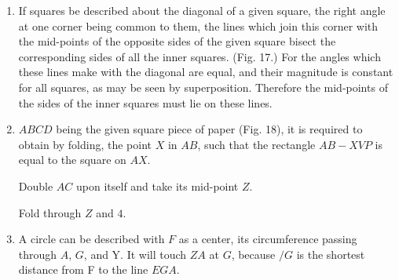 \begin{enumerate}
    \item If squares be described about the diagonal of a given square, the
        right angle at one corner being common to them, the lines which join
        this corner with the mid-points of the opposite sides of the given
        square bisect the corresponding sides of all the inner squares. (Fig.
        17.) For the angles which these lines make with the diagonal are equal,
        and their magnitude is constant for all squares, as may be seen by
        superposition. Therefore the mid-points of the sides of the inner
        squares must lie on these lines.

    \item $ABCD$ being the given square piece of paper (Fig. 18), it is required
        to obtain by folding, the point $X$ in $AB$, such that the rectangle
        $AB-XVP$ is equal to the square on $AX$.

        Double $AC$ upon itself and take its mid-point $Z$.

        Fold through $Z$ and $4$.

%
%
%
%
%
%
%
%
%
    
    \item A circle can be described with $F$ as a center, its circumference
        passing through $A$, $G$, and Y.  It will touch $ZA$ at $G$, because 
        $/G$ is the shortest distance from F to the line $EGA$.

%
%
%
%
%
%
%
%
%
%
%
%
%
%


\end{enumerate}
